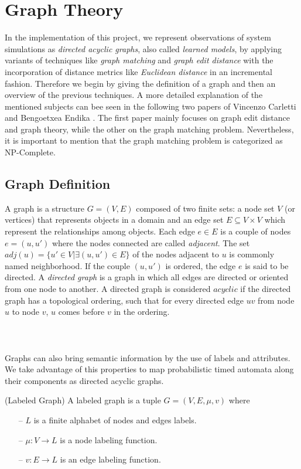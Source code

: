 \section{Graph Theory}
In the implementation of this project, we represent observations of system simulations as \textit{directed acyclic graphs}, also called \textit{learned models}, by applying variants of techniques like \textit{graph matching} and \textit{graph edit distance} with the incorporation of distance metrics like \textit{Euclidean distance} in an incremental fashion. Therefore we begin by giving the definition of a graph and then an overview of the previous techniques. A more detailed explanation of the mentioned subjects can bee seen in the following two papers of Vincenzo Carletti \cite{graphMatching} and Bengoetxea Endika \cite{theGraphMatchingProblem}. The first paper mainly focuses on graph edit distance and graph theory, while the other on the graph matching problem. Nevertheless, it is important to mention that the graph matching problem is categorized as NP-Complete.

\subsection{Graph Definition}
A graph is a structure $G=(V,E)$ composed of two finite sets: a node set $V$ (or vertices) that represents objects in a domain and an edge set $E \subseteq V \times V$ which represent the relationships among objects. Each edge $e \in E$ is a couple of nodes $e=(u,u')$ where the nodes connected are called \textit{adjacent}. The set $adj(u) = \{ u' \in V | \exists (u,u') \in E \}$ of the nodes adjacent to $u$ is commonly named neighborhood. If the couple $(u,u')$ is ordered, the edge $e$ is said to be directed. A \textit{directed graph} is a graph in which all edges are directed or oriented from one node to another. A directed graph is considered $acyclic$ if the directed graph has a topological ordering, such that for every directed edge $uv$ from node $u$ to node $v$, $u$ comes before $v$ in the ordering.\\ \\ \\ \\
%
Graphs can also bring semantic information by the use of labels and attributes. We take advantage of this properties to map probabilistic timed automata along their components as directed acyclic graphs.
%
\theoremstyle{definition}
\begin{definition}{(Labeled Graph)}
	A labeled graph is a tuple $G= (V,E,\mu, v)$ where
	\begin{itemize}
		\item[--]
		$L$ is a finite alphabet of nodes and edges labels.
		\item[--]
		$\mu: V \rightarrow L$ is a node labeling function. 
		\item[--]
		$v: E \rightarrow L$ is an edge labeling function.  
	\end{itemize} 
\end{definition}

